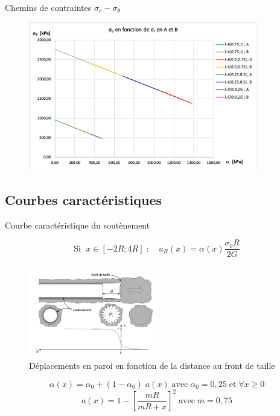 \documentclass{beamer}
\begin{document}
\begin{frame}{Chemins de contraintes $\sigma_r - \sigma_{\theta}$}
    
\begin{figure}
\centering
\includegraphics[width=10cm]{sig.png}
\end{figure}

\end{frame}




\subsection{Courbes caractéristiques}

\begin{frame}{Courbe caractéristique du soutènement}

\[\text{Si }\;x\in[-2R;4R]\;:\quad u_R(x)=\alpha(x)\dfrac{\sigma_0R}{2G}\]

\begin{figure}
\centering
\includegraphics[height=4cm]{CourbeSout.png}
\caption{\scriptsize{Déplacements en paroi en fonction de la distance au front de taille}}
\label{CourbeSout}
\end{figure}
\vspace{-0.3cm}    
\[\alpha(x)=\alpha_0+(1-\alpha_0)\;a(x)\;\text{avec}\;\alpha_0=0,25\;\text{et}\;\forall x\geq0\]\[a(x)=1-\left[\dfrac{mR}{mR+x}\right]^2\;\text{avec}\;m=0,75\]
    
\end{frame}
\end{document}
